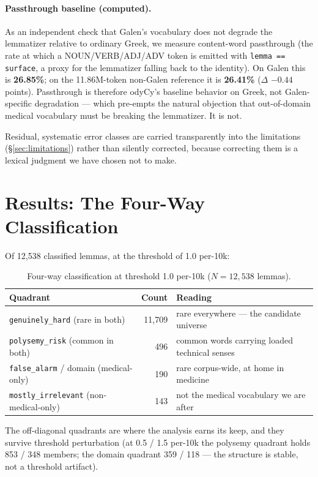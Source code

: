 \documentclass[11pt]{article}
\begin{document}
\paragraph{Passthrough baseline (computed).}
As an independent check that Galen's vocabulary does not
degrade the lemmatizer relative to ordinary Greek, we measure content-word passthrough (the rate at
which a NOUN/VERB/ADJ/ADV token is emitted with \texttt{lemma == surface}, a proxy for the lemmatizer
falling back to the identity). On Galen this is \textbf{26.85\%}; on the 11.86M-token non-Galen reference
it is \textbf{26.41\%} ($\Delta$ $-0.44$ points). Passthrough is therefore odyCy's baseline behavior on Greek, not
Galen-specific degradation --- which pre-empts the natural objection that out-of-domain medical
vocabulary must be breaking the lemmatizer. It is not.

Residual, systematic error classes are carried transparently into the limitations (\S\ref{sec:limitations}) rather than
silently corrected, because correcting them is a lexical judgment we have chosen not to make.

\section{Results: The Four-Way Classification}
\label{sec:results}

Of 12{,}538 classified lemmas, at the threshold of 1.0 per-10k:

\begin{table}[t]
\centering
\begin{tabular}{lrl}
\toprule
\textbf{Quadrant} & \textbf{Count} & \textbf{Reading} \\
\midrule
\texttt{genuinely\_hard} (rare in both) & 11{,}709 & rare everywhere --- the candidate universe \\
\texttt{polysemy\_risk} (common in both) & 496 & common words carrying loaded technical senses \\
\texttt{false\_alarm} / domain (medical-only) & 190 & rare corpus-wide, at home in medicine \\
\texttt{mostly\_irrelevant} (non-medical-only) & 143 & not the medical vocabulary we are after \\
\bottomrule
\end{tabular}
\caption{Four-way classification at threshold 1.0 per-10k ($N=12{,}538$ lemmas).}
\label{tab:fourway}
\end{table}

The off-diagonal quadrants are where the analysis earns its keep, and they survive threshold
perturbation (at 0.5 / 1.5 per-10k the polysemy quadrant holds 853 / 348 members; the domain
quadrant 359 / 118 --- the structure is stable, not a threshold artifact).
\end{document}
